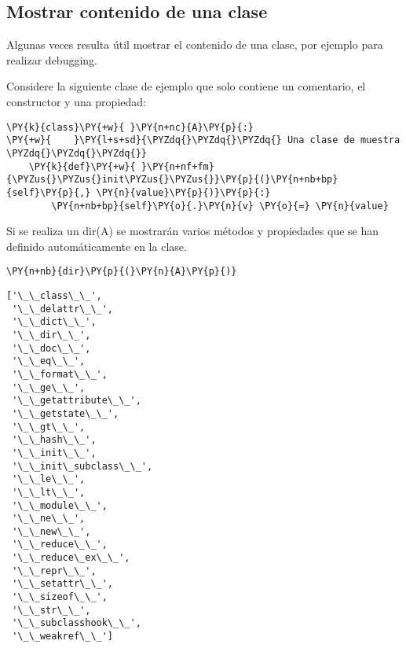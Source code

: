 \subsection{Mostrar contenido de una clase}

Algunas veces resulta útil mostrar el contenido de una clase, por
ejemplo para realizar debugging.

Considere la siguiente clase de ejemplo que solo contiene un comentario,
el constructor y una propiedad:

\begin{tcolorbox}[breakable, size=fbox, boxrule=1pt, pad at break*=1mm,colback=cellbackground, colframe=cellborder]
\begin{Verbatim}[commandchars=\\\{\}]
\PY{k}{class}\PY{+w}{ }\PY{n+nc}{A}\PY{p}{:}
\PY{+w}{    }\PY{l+s+sd}{\PYZdq{}\PYZdq{}\PYZdq{} Una clase de muestra \PYZdq{}\PYZdq{}\PYZdq{}}
    \PY{k}{def}\PY{+w}{ }\PY{n+nf+fm}{\PYZus{}\PYZus{}init\PYZus{}\PYZus{}}\PY{p}{(}\PY{n+nb+bp}{self}\PY{p}{,} \PY{n}{value}\PY{p}{)}\PY{p}{:}
        \PY{n+nb+bp}{self}\PY{o}{.}\PY{n}{v} \PY{o}{=} \PY{n}{value}
\end{Verbatim}
\end{tcolorbox}

Si se realiza un dir(A) se mostrarán varios métodos y propiedades que se
han definido automáticamente en la clase.

\begin{tcolorbox}[breakable, size=fbox, boxrule=1pt, pad at break*=1mm,colback=cellbackground, colframe=cellborder]
\begin{Verbatim}[commandchars=\\\{\}]
\PY{n+nb}{dir}\PY{p}{(}\PY{n}{A}\PY{p}{)}
\end{Verbatim}
\end{tcolorbox}

\begin{tcolorbox}[breakable, size=fbox, boxrule=.5pt, pad at break*=1mm, opacityfill=0]
\begin{Verbatim}[commandchars=\\\{\}]
['\_\_class\_\_',
 '\_\_delattr\_\_',
 '\_\_dict\_\_',
 '\_\_dir\_\_',
 '\_\_doc\_\_',
 '\_\_eq\_\_',
 '\_\_format\_\_',
 '\_\_ge\_\_',
 '\_\_getattribute\_\_',
 '\_\_getstate\_\_',
 '\_\_gt\_\_',
 '\_\_hash\_\_',
 '\_\_init\_\_',
 '\_\_init\_subclass\_\_',
 '\_\_le\_\_',
 '\_\_lt\_\_',
 '\_\_module\_\_',
 '\_\_ne\_\_',
 '\_\_new\_\_',
 '\_\_reduce\_\_',
 '\_\_reduce\_ex\_\_',
 '\_\_repr\_\_',
 '\_\_setattr\_\_',
 '\_\_sizeof\_\_',
 '\_\_str\_\_',
 '\_\_subclasshook\_\_',
 '\_\_weakref\_\_']
\end{Verbatim}
\end{tcolorbox}
        

